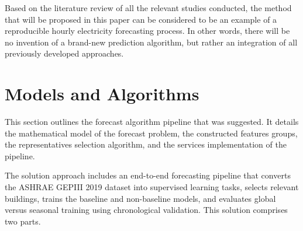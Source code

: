 \documentclass[conference]{IEEEtran}
\begin{document}
Based on the literature review of all the relevant studies conducted, the method that will be proposed in this paper can be considered to be an example of a reproducible hourly electricity forecasting process. In other words, there will be no invention of a brand-new prediction algorithm, but rather an integration of all previously developed approaches.


\section{Models and Algorithms}
\label{sec:proposed-solution}
This section outlines the forecast algorithm pipeline that was suggested.
It details the mathematical model of the forecast problem,
the constructed features groups, the representatives selection algorithm,
and the services implementation of the pipeline.


The solution approach includes an end-to-end forecasting pipeline that converts the ASHRAE GEPIII 2019 dataset into supervised learning tasks, selects relevant buildings, trains the baseline and non-baseline models, and evaluates global versus seasonal training using chronological validation. This solution comprises two parts. 
\end{document}
